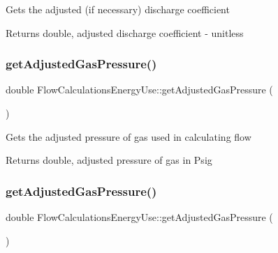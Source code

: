 Gets the adjusted (if necessary) discharge coefficient

\begin{DoxyReturn}{Returns}
double, adjusted discharge coefficient -\/ unitless 
\end{DoxyReturn}
\mbox{\label{class_flow_calculations_energy_use_a8633821730568a5b1449914060c52aad}} 
\subsubsection{\texorpdfstring{get\+Adjusted\+Gas\+Pressure()}{getAdjustedGasPressure()}\hspace{0.1cm}{\footnotesize\ttfamily [1/3]}}
{\footnotesize\ttfamily double Flow\+Calculations\+Energy\+Use\+::get\+Adjusted\+Gas\+Pressure (\begin{DoxyParamCaption}{ }\end{DoxyParamCaption})}

Gets the adjusted pressure of gas used in calculating flow

\begin{DoxyReturn}{Returns}
double, adjusted pressure of gas in Psig 
\end{DoxyReturn}
\mbox{\label{class_flow_calculations_energy_use_a8633821730568a5b1449914060c52aad}} 
\subsubsection{\texorpdfstring{get\+Adjusted\+Gas\+Pressure()}{getAdjustedGasPressure()}\hspace{0.1cm}{\footnotesize\ttfamily [2/3]}}
{\footnotesize\ttfamily double Flow\+Calculations\+Energy\+Use\+::get\+Adjusted\+Gas\+Pressure (\begin{DoxyParamCaption}{ }\end{DoxyParamCaption})}

